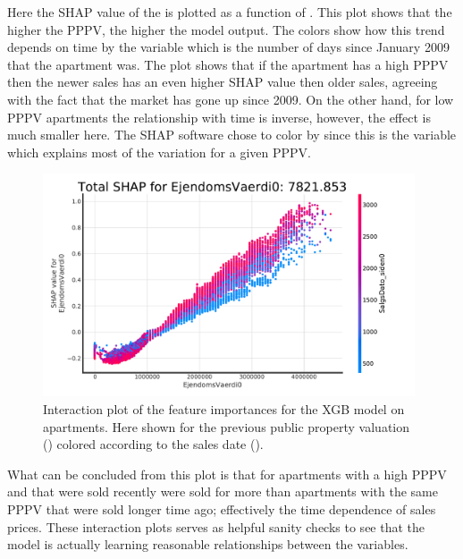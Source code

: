 Here the SHAP value of the  is plotted as a function of . This plot shows that the higher the PPPV, the higher the model output. The colors show how this trend depends on time by the variable  which is the number of days since January  2009 that the apartment was. The plot shows that if the apartment has a high PPPV then the newer sales has an even higher SHAP value then older sales, agreeing with the fact that the market has gone up since 2009. On the other hand, for low PPPV apartments the relationship with time is inverse, however, the effect is much smaller here. The SHAP software chose to color by  since this is the variable which explains most of the variation for a given PPPV. 

\begin{figure}
  \centerfloat
  \includegraphics[draft=false, width=0.98\textwidth, trim=15 15 40 40, clip]{figures/housing/Ejerlejlighed_v19_cut_all_Ncols_all_xgb_tight_SHAP_vals_interaction_Vaerdi0.pdf}
  \caption[Feature Importance Interaction Plot for Apartments]
          {Interaction plot of the feature importances for the XGB model on apartments. Here shown for the previous public property valuation () colored according to the sales date ().} 
  \label{fig:h:shap_overview_interaction}
\end{figure}

What can be concluded from this plot is that for apartments with a high PPPV and that were sold recently were sold for more than apartments with the same PPPV that were sold longer time ago; effectively the time dependence of sales prices. These interaction plots serves as helpful sanity checks to see that the model is actually learning reasonable relationships between the variables. 

